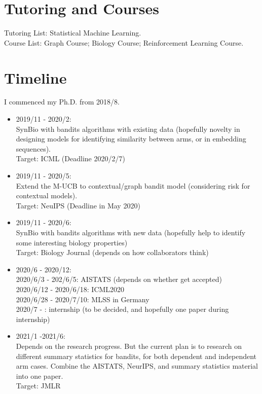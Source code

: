 \section{Tutoring and Courses}

Tutoring List: Statistical Machine Learning.\\
Course List: Graph Course; Biology Course; Reinforcement Learning Course.

\section{Timeline}

I commenced my Ph.D. from 2018/8.

\begin{itemize}
    \item 2019/11 - 2020/2: \\
    SynBio with bandits algorithms with existing data (hopefully novelty in designing models for identifying similarity between arms, or in embedding sequences).\\
    Target: ICML (Deadline 2020/2/7)
    \item 2019/11 - 2020/5: \\
    Extend the M-UCB to contextual/graph bandit model (considering risk for contextual models).\\
    Target: NeuIPS (Deadline in May 2020)
    \item 2019/11 - 2020/6: \\
    SynBio with bandits algorithms with new data (hopefully help to identify some interesting biology properties) \\
    Target: Biology Journal (depends on how collaborators think)
    \item 2020/6 - 2020/12:\\
    2020/6/3 - 202/6/5: AISTATS (depends on whether get accepted)\\
    2020/6/12 - 2020/6/18: ICML2020\\
    2020/6/28 - 2020/7/10: MLSS in Germany\\
    2020/7 - : internship (to be decided, and hopefully one paper during internship)\\
    \item 2021/1 -2021/6:\\
    Depends on the research progress. But the current plan is to research on different summary statistics for bandits, for both dependent and independent arm cases. 
    Combine the AISTATS, NeurIPS, and summary statistics material into one paper.\\
    Target: JMLR
    
    
    
    
\end{itemize}